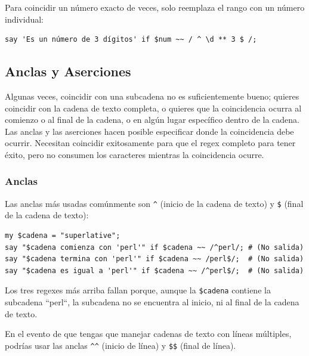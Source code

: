 Para coincidir un número exacto de veces, solo reemplaza el 
rango con un número individual:

\begin{lstlisting}
say 'Es un número de 3 dígitos' if $num ~~ / ^ \d ** 3 $ /;
\end{lstlisting}
%

\subsection{Anclas y Aserciones}

Algunas veces, coincidir con una subcadena no es suficientemente
bueno; quieres coincidir con la cadena de texto completa, 
o quieres que la coincidencia ocurra al comienzo o al final de la cadena,
o en algún lugar específico dentro de la cadena. Las anclas y las 
aserciones hacen posible especificar donde la coincidencia debe
ocurrir. Necesitan coincidir exitosamente para que el regex completo
para tener éxito, pero no consumen los caracteres mientras la 
coincidencia ocurre.

\subsubsection{Anclas}


Las anclas más usadas comúnmente son \verb|^| (inicio de la
cadena de texto) y \verb|$| (final de la cadena de texto):

\begin{lstlisting}
my $cadena = "superlative";
say "$cadena comienza con 'perl'" if $cadena ~~ /^perl/; # (No salida)
say "$cadena termina con 'perl'" if $cadena ~~ /perl$/;  # (No salida)
say "$cadena es igual a 'perl'" if $cadena ~~ /^perl$/;  # (No salida)
\end{lstlisting}

Los tres regexes más arriba fallan porque, aunque 
la \verb|$cadena| contiene la subcadena ``perl``, la
subcadena no se encuentra al inicio, ni al final de 
la cadena de texto.

En el evento de que tengas que manejar cadenas de texto con líneas
múltiples, podrías usar las anclas \verb|^^| (inicio de línea) y \verb|$$| 
(final de línea).

